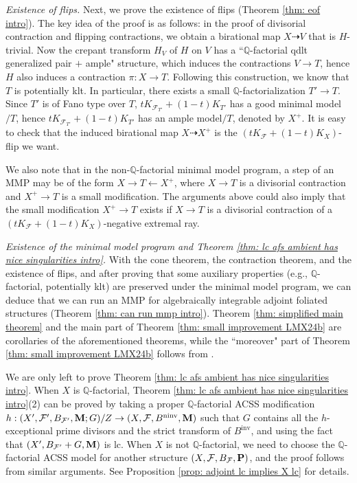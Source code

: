 \documentclass[12pt]{amsart}
\numberwithin{equation}{section}
\newcommand{\Mm}{{\bf{M}}}
\newcommand{\Pp}{{\bf{P}}}
\newcommand{\Qq}{\mathbb{Q}}
\newcommand{\ninv}{\operatorname{ninv}}
\newcommand{\inv}{\operatorname{inv}}
\newcommand{\Ff}{\mathcal{F}}
\theoremstyle{definition}
\theoremstyle{definition}
\theoremstyle{definition}
\begin{document}
\smallskip

\noindent\textit{Existence of flips.} Next, we prove the existence of flips (Theorem \ref{thm: eof intro}). The key idea of the proof is as follows: in the proof of divisorial contraction and flipping contractions, we obtain a birational map $X \dashrightarrow V$ that is $H$-trivial. Now the crepant transform $H_V$ of $H$ on $V$ has a ``$\Qq$-factorial qdlt generalized pair $+$ ample" structure, which induces the contractions $V \rightarrow T$, hence $H$ also induces a contraction $\pi: X \rightarrow T$. Following this construction, we know that $T$ is potentially klt. In particular, there exists a small $\Qq$-factorialization $T' \rightarrow T$. Since $T'$ is of Fano type over $T$, $tK_{\Ff_{T'}}+(1-t)K_{T'}$ has a good minimal model$/T$, hence $tK_{\Ff_{T'}}+(1-t)K_{T'}$ has an ample model$/T$, denoted by $X^+$. It is easy to check that the induced birational map $X \dashrightarrow X^+$ is the $(tK_{\Ff}+(1-t)K_X)$-flip we want.

We also note that in the non-$\Qq$-factorial minimal model program, a step of an MMP may be of the form $X \rightarrow T \leftarrow X^+$, where $X \rightarrow T$ is a divisorial contraction and $X^+ \rightarrow T$ is a small modification. The arguments above could also imply that the small modification $X^+ \rightarrow T$ exists if $X \rightarrow T$ is a divisorial contraction of a $(tK_{\Ff}+(1-t)K_X)$-negative extremal ray.







\smallskip


\noindent\textit{Existence of the minimal model program and Theorem \ref{thm: lc afs ambient has nice singularities intro}.} With the cone theorem, the contraction theorem, and the existence of flips, and after proving that some auxiliary properties (e.g., $\Qq$-factorial, potentially klt) are preserved under the minimal model program, we can deduce that we can run an MMP for algebraically integrable adjoint foliated structures (Theorem \ref{thm: can run mmp intro}). Theorem \ref{thm: simplified main theorem} and the main part of Theorem \ref{thm: small improvement LMX24b} are corollaries of the aforementioned theorems, while the ``moreover" part of Theorem \ref{thm: small improvement LMX24b} follows from \cite[Theorems 1.10 and 1.11]{LMX24b}.

We are only left to prove Theorem \ref{thm: lc afs ambient has nice singularities intro}. When $X$ is $\Qq$-factorial, Theorem \ref{thm: lc afs ambient has nice singularities intro}(2) can be proved by taking a proper $\Qq$-factorial ACSS modification $h: (X',\Ff',B_{\Ff'},\Mm;G)/Z \rightarrow (X,\Ff,B^{\ninv},\Mm)$ such that $G$ contains all the $h$-exceptional prime divisors and the strict transform of $B^{\inv}$, and using the fact that $(X',B_{\Ff'}+G,\Mm)$ is lc. When $X$ is not $\Qq$-factorial, we need to choose the $\Qq$-factorial ACSS model for another structure $(X,\Ff,B_{\Ff},\Pp)$, and the proof follows from similar arguments. See Proposition \ref{prop: adjoint lc implies X lc} for details.
\end{document}

